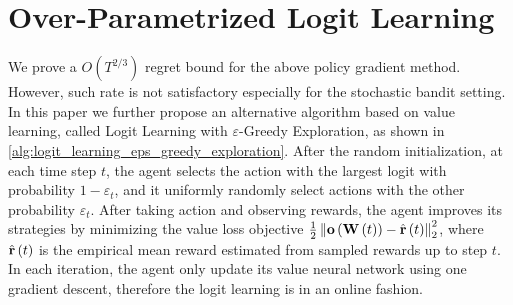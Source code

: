 \section{Over-Parametrized Logit Learning}
\label{sec:logitlearning}
We prove a $O(T^{2/3})$ regret bound for the above policy gradient method.
However, such rate is not satisfactory especially for the stochastic bandit setting. In this paper we further propose an alternative algorithm based on value learning, called Logit Learning with $\varepsilon$-Greedy Exploration, as shown in \cref{alg:logit_learning_eps_greedy_exploration}. 
After the random initialization, at each time step $t$, the agent selects the action with the largest logit with probability $1 - \varepsilon_t$, and it uniformly randomly select actions with the other probability $\varepsilon_t$. After taking action and observing rewards, the agent improves its strategies by minimizing the value loss objective $\frac{1}{2} \left\| {\mathbf{o}}\left( {\mathbf{W}}\left(t\right)\right) - \hat{{\mathbf{r}}}\left(t\right) \right\|_2^2$, where $\hat{{\mathbf{r}}}\left(t\right)$ is the empirical mean reward estimated from sampled rewards up to step $t$. In each iteration, the agent only update its value neural network using one gradient descent, therefore the logit learning is in an online fashion.


